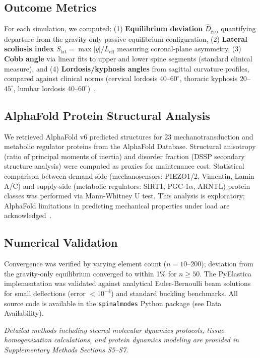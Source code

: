 \subsection{Outcome Metrics}

For each simulation, we computed: (1) \textbf{Equilibrium deviation} $\widehat{D}_{\mathrm{geo}}$ quantifying departure from the gravity-only passive equilibrium configuration, (2) \textbf{Lateral scoliosis index} $S_{\mathrm{lat}} = \max|y|/L_{\mathrm{eff}}$ measuring coronal-plane asymmetry, (3) \textbf{Cobb angle} via linear fits to upper and lower spine segments (standard clinical measure), and (4) \textbf{Lordosis/kyphosis angles} from sagittal curvature profiles, compared against clinical norms (cervical lordosis $40$--$60^{\circ}$, thoracic kyphosis $20$--$45^{\circ}$, lumbar lordosis $40$--$60^{\circ}$)~\cite{white_panjabi_spine}.

\subsection{AlphaFold Protein Structural Analysis}

We retrieved AlphaFold v6 predicted structures for 23 mechanotransduction and metabolic regulator proteins from the AlphaFold Database. Structural anisotropy (ratio of principal moments of inertia) and disorder fraction (DSSP secondary structure analysis) were computed as proxies for maintenance cost. Statistical comparison between demand-side (mechanosensors: PIEZO1/2, Vimentin, Lamin A/C) and supply-side (metabolic regulators: SIRT1, PGC-1$\alpha$, ARNTL) protein classes was performed via Mann-Whitney U test. This analysis is exploratory; AlphaFold limitations in predicting mechanical properties under load are acknowledged~\cite{gomes2022protein}.

\subsection{Numerical Validation}

Convergence was verified by varying element count ($n=10$--200); deviation from the gravity-only equilibrium converged to within 1\% for $n \geq 50$. The PyElastica implementation was validated against analytical Euler-Bernoulli beam solutions for small deflections (error $< 10^{-4}$) and standard buckling benchmarks. All source code is available in the \texttt{spinalmodes} Python package (see Data Availability).

\textit{Detailed methods including steered molecular dynamics protocols, tissue homogenization calculations, and protein dynamics modeling are provided in Supplementary Methods Sections S5--S7.}
